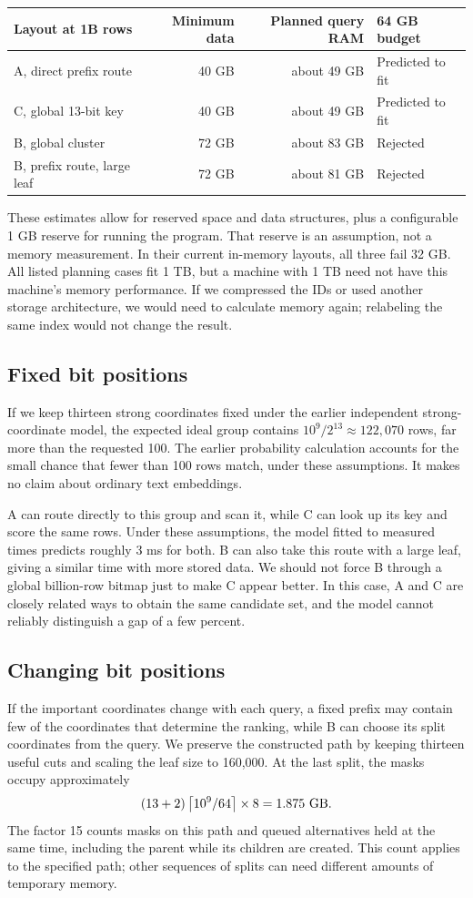 \begin{center}
\begin{tabular}{@{}lrrl@{}}\toprule
Layout at 1B rows & Minimum data & Planned query RAM & 64 GB budget\\\midrule
A, direct prefix route & 40 GB & about 49 GB & Predicted to fit\\
C, global 13-bit key & 40 GB & about 49 GB & Predicted to fit\\
B, global cluster & 72 GB & about 83 GB & Rejected\\
B, prefix route, large leaf & 72 GB & about 81 GB & Rejected\\\bottomrule
\end{tabular}
\end{center}
These estimates allow for reserved space and data structures, plus a configurable 1 GB
reserve for running the program. That reserve is an assumption, not a memory measurement. In their current in-memory layouts,
all three fail 32 GB. All listed planning cases fit 1 TB, but a machine with 1 TB need not
have this machine's memory performance. If we compressed the IDs or used another storage
architecture, we would need to calculate memory again; relabeling the same index would not
change the result.

\subsection{Fixed bit positions}
If we keep thirteen strong coordinates fixed under the earlier independent strong-coordinate
model, the expected ideal group contains $10^9/2^{13}\approx122{,}070$ rows, far more than
the requested 100. The earlier probability calculation accounts for the small chance that fewer than 100
rows match, under these assumptions. It makes no claim about ordinary text embeddings.

A can route directly to this group and scan it, while C can look up its key and score the
same rows. Under these assumptions, the model fitted to measured times predicts roughly 3 ms for both. B can also take this
route with a large leaf, giving a similar time with more stored data. We should not force B
through a global billion-row bitmap just to make C appear better. In this case, A and C are closely
related ways to obtain the same candidate set, and the model cannot reliably distinguish a gap of a few percent.

\subsection{Changing bit positions}
If the important coordinates change with each query, a fixed prefix may contain few
of the coordinates that determine the ranking, while B can choose its split coordinates from the query. We preserve the
constructed path by keeping thirteen useful cuts and scaling the leaf size to 160,000.
At the last split, the masks occupy approximately
\[
(13+2)\ceil{10^9/64}\times8=1.875\ \text{GB}.
\]
The factor 15 counts masks on this path and queued alternatives held at the same time,
including the parent while its children are created. This count applies to the specified
path; other sequences of splits can need different amounts of temporary memory.

